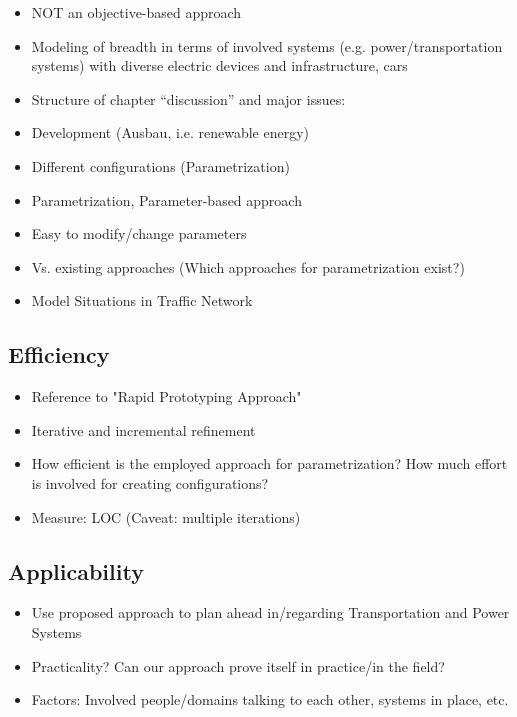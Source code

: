 
\begin{itemize}
	\item NOT an objective-based approach
	\item Modeling of breadth in terms of involved systems (e.g. power/transportation systems) with diverse electric devices and infrastructure, cars
	\item Structure of chapter “discussion” and major issues:
	\item Development (Ausbau, i.e. renewable energy)
	\item Different configurations (Parametrization)
	\item Parametrization, Parameter-based approach
	\item Easy to modify/change parameters
	\item Vs. existing approaches (Which approaches for parametrization exist?)
	\item Model Situations in Traffic Network
\end{itemize}

\subsection{Efficiency}

\begin{itemize}
	\item Reference to "Rapid Prototyping Approach"
	\item Iterative and incremental refinement
	\item How efficient is the employed approach for parametrization? How much effort is involved for creating configurations?
	\item Measure: LOC (Caveat: multiple iterations)
\end{itemize}

\subsection{Applicability}

\begin{itemize}
	\item Use proposed approach to plan ahead in/regarding Transportation and Power Systems
	\item Practicality? Can our approach prove itself in practice/in the field?
	\item Factors: Involved people/domains talking to each other, systems in place, etc.
\end{itemize}